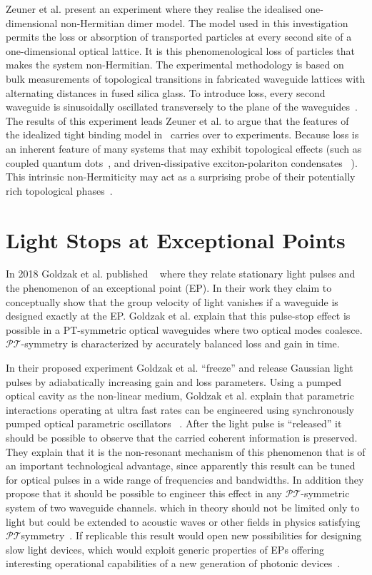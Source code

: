 \documentclass[12pt, a4paper]{report}
\newcommand\PT{\(\mathcal{PT}\)}
\begin{document}
Zeuner et al. present an experiment where they realise the idealised one-dimensional non-Hermitian dimer model. The model used in this investigation permits the loss or absorption of transported particles at every second site of a one-dimensional optical lattice. It is this phenomenological loss of particles that makes the system non-Hermitian. The experimental methodology is based on bulk measurements of topological transitions in fabricated waveguide lattices with alternating distances in fused silica glass.
To introduce loss, every second waveguide is sinusoidally oscillated transversely to the plane of the waveguides~\cite{TopoTrans}.
The results of this experiment leads Zeuner et al. to argue that the features of the idealized tight binding model in~\cite{Rudner} carries over to experiments. Because loss is an inherent feature of many systems that may exhibit topological effects (such as coupled quantum dots~\cite{Rudner}, and driven-dissipative exciton-polariton condensates ~\cite{Cones}). This intrinsic non-Hermiticity may act as a surprising probe of their potentially rich topological phases~\cite{TopoTrans}.

\section{Light Stops at Exceptional Points}\label{StopLight}
In 2018 Goldzak et al. published ~\cite{LightStopsatEPs} where they relate stationary light pulses and the phenomenon of an exceptional point (EP). In their work they claim to conceptually show that the group velocity of light vanishes if a waveguide is designed exactly at the EP. Goldzak et al. explain that this pulse-stop effect is possible in a PT-symmetric optical waveguides where two optical modes coalesce. \PT-symmetry is characterized by accurately balanced loss and gain in time. 

In their proposed experiment Goldzak et al. ``freeze'' and release Gaussian light pulses by adiabatically increasing gain and loss parameters. Using a pumped optical cavity as the non-linear medium, Goldzak et al. explain that parametric interactions operating at ultra fast rates can be engineered using synchronously pumped optical parametric oscillators ~\cite{LightStopsatEPs}. After the light pulse is ``released'' it should be possible to observe that the carried coherent information is preserved. They explain that it is the non-resonant mechanism of this phenomenon that is of an important technological advantage, since apparently this result can be tuned for optical pulses in a wide range of frequencies and bandwidths. In addition they propose that it should be possible to engineer this effect in any \PT-symmetric system of two waveguide channels. which in theory should not be limited only to light but could be extended to acoustic waves or other fields in physics satisfying \PT symmetry~\cite{LightStopsatEPs}.
If replicable this result would open new possibilities for designing slow light devices, which would
exploit generic properties of EPs offering interesting operational capabilities of a new generation of photonic devices~\cite{LightStopsatEPs}.
\end{document}
